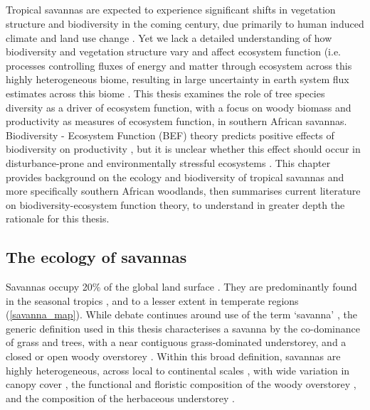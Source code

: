 \begin{refsection}


\chapter{\chaptertitle}
\label{ch:background}

Tropical savannas are expected to experience significant shifts in vegetation structure and biodiversity in the coming century, due primarily to human induced climate and land use change \citep{Ross2021, Scheiter2009, Moncrieff2016}. Yet we lack a detailed understanding of how biodiversity and vegetation structure vary and affect ecosystem function (i.e. processes controlling fluxes of energy and matter through ecosystem across this highly heterogeneous biome, resulting in large uncertainty in earth system flux estimates across this biome \citep{Ahlstrom2015}. This thesis examines the role of tree species diversity as a driver of ecosystem function, with a focus on woody biomass and productivity as measures of ecosystem function, in southern African savannas. Biodiversity - Ecosystem Function (BEF) theory predicts positive effects of biodiversity on productivity \citep{Tilman2014}, but it is unclear whether this effect should occur in disturbance-prone and environmentally stressful ecosystems \citep{Steudel2012, Baert2018}. This chapter provides background on the ecology and biodiversity of tropical savannas and more specifically southern African woodlands, then summarises current literature on biodiversity-ecosystem function theory, to understand in greater depth the rationale for this thesis.

\section{The ecology of savannas}

Savannas occupy \textapprox{}20\% of the global land surface \citep{Scholes1993}. They are predominantly found in the seasonal tropics \citep{Scholes1997}, and to a lesser extent in temperate regions (\autoref{savanna_map}). While debate continues around use of the term `savanna' \citep{Lehmann2011, Ratnam2011}, the generic definition used in this thesis characterises a savanna by the co-dominance of grass and trees, with a near contiguous grass-dominated understorey, and a closed or open woody overstorey \citep{Scholes1997, Bond2008}. Within this broad definition, savannas are highly heterogeneous, across local to continental scales \citep{Bucini2007}, with wide variation in canopy cover \citep{Sankaran2005, Hirota2011}, the functional and floristic composition of the woody overstorey \citep{Fayolle2018, Solbrig1996}, and the composition of the herbaceous understorey \citep{Siebert2019, Coller2018}.


\end{refsection}
